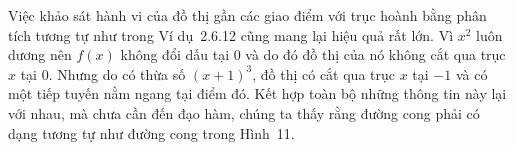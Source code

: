 \documentclass[10pt,a4paper]{article}
\begin{document}
\begin{minipage}[t]{0.71\textwidth}
    Việc khảo sát hành vi của đồ thị gần các giao điểm với trục hoành bằng phân tích tương tự như trong Ví dụ~2.6.12 cũng mang lại hiệu quả rất lớn. Vì $x^2$ luôn dương nên $f(x)$ không đổi dấu tại $0$ và do đó đồ thị của nó không cắt qua trục $x$ tại $0$. Nhưng do có thừa số $(x + 1)^3$, đồ thị có cắt qua trục $x$ tại $-1$ và có một tiếp tuyến nằm ngang tại điểm đó. Kết hợp toàn bộ những thông tin này lại với nhau, mà chưa cần đến đạo hàm, chúng ta thấy rằng đường cong phải có dạng tương tự như đường cong trong Hình~11.
\end{minipage}
\end{document}

